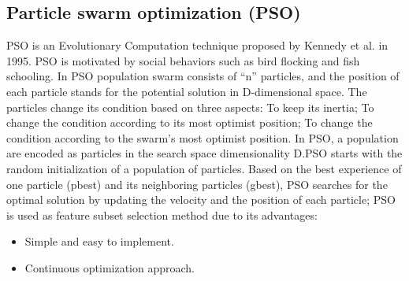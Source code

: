 \documentclass{book}
\begin{document}
    \subsection{Particle swarm optimization (PSO)}			
    PSO is an Evolutionary Computation technique proposed by Kennedy et al. in 1995. PSO is motivated by social behaviors such as bird flocking and fish schooling. In PSO population swarm consists of “n” particles, and the position of each particle stands for the potential solution in D-dimensional space. The particles change its condition based on three aspects: To keep its inertia; To change the condition according to its most optimist position; To change the condition according to the swarm’s most optimist position. In PSO, a population are encoded as particles in the search space dimensionality D.PSO starts with the random initialization of a population of particles. Based on the best experience of one particle (pbest) and its neighboring particles (gbest), PSO searches for the optimal solution by updating the velocity and the position of each particle; PSO is used as feature subset selection method due to its advantages:
    \begin{itemize}
    	\item Simple and easy to implement.
    	\item Continuous optimization approach.
    \end{itemize}
    
\end{document}
